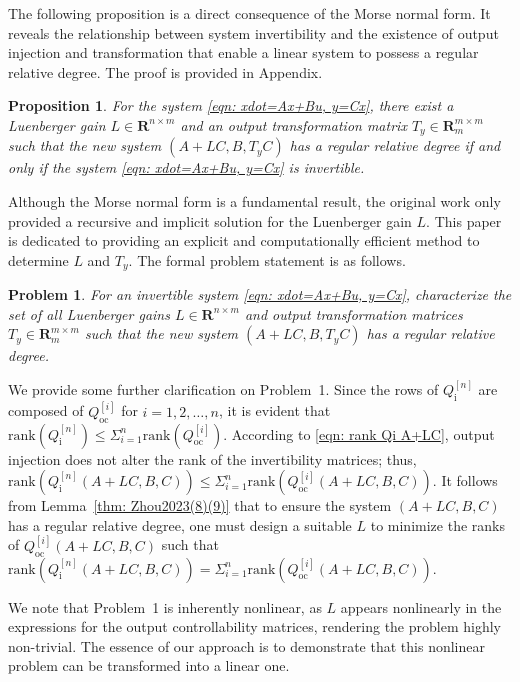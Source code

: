\documentclass[sort&compress]{elsarticle}
\newtheorem{problem}{Problem}
\newtheorem{prop}{Proposition}
\newcommand\Qi{Q_\mathrm i}
\newcommand\Qoc{Q_\mathrm{oc}}
\newcommand\rank{\mathrm{rank}}
\newcommand\R{\mathbf R}
\begin{document}
The following proposition is a direct consequence of the Morse normal form.
It reveals the relationship between system invertibility and the existence of
output injection and transformation that enable a linear system to possess
a regular relative degree.
The proof is provided in Appendix.

\begin{prop}\label{thm: invertible and Morse form}
For the system \eqref{eqn: xdot=Ax+Bu, y=Cx},
there exist a Luenberger gain $L\in\R^{n\times m}$ and
an output transformation matrix $T_y\in\R^{m\times m}_m$
such that the new system $(A+LC,B,T_yC)$
has a regular relative degree
if and only if the system \eqref{eqn: xdot=Ax+Bu, y=Cx} is invertible.
\end{prop}

Although the Morse normal form is a fundamental result, the original work \cite{Morse1973SIAM[J]}
only provided a recursive and implicit solution for the Luenberger gain $L$.
This paper is dedicated to providing an explicit and computationally efficient
method to determine $L$ and $T_y$.
The formal problem statement is as follows.

\begin{problem}
For an invertible system \eqref{eqn: xdot=Ax+Bu, y=Cx},
characterize the set of all Luenberger gains $L\in\R^{n\times m}$
and output transformation matrices $T_y\in\R^{m\times m}_m$
such that the new system $(A+LC,B,T_yC)$
has a regular relative degree.
\end{problem}

We provide some further clarification on Problem~1.
Since the rows of $\Qi^{[n]}$ are composed of $\Qoc^{[i]}$ for $i=1,2,\dots,n$,
it is evident that
$\rank(\Qi^{[n]})\le\Sigma_{i=1}^n\rank(\Qoc^{[i]})$.
According to \eqref{eqn: rank Qi A+LC}, output injection
does not alter the rank of the invertibility matrices; thus,
$\rank(\Qi^{[n]}(A+LC,B,C))\le
\Sigma_{i=1}^n\rank(\Qoc^{[i]}(A+LC,B,C))$.
It follows from Lemma~\ref{thm: Zhou2023(8)(9)}
that to ensure the system $(A+LC,B,C)$ has a regular relative degree,
one must design a suitable $L$ to
minimize the ranks of $\Qoc^{[i]}(A+LC,B,C)$ such that
$\rank(\Qi^{[n]}(A+LC,B,C))=
\Sigma_{i=1}^n\rank(\Qoc^{[i]}(A+LC,B,C))$.

We note that Problem~1 is inherently nonlinear, as $L$
appears nonlinearly in the expressions for the output controllability matrices,
rendering the problem highly non-trivial.
The essence of our approach is to demonstrate that this nonlinear problem
can be transformed into a linear one.
\end{document}
